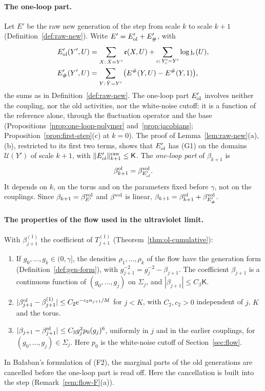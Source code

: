 \paragraph{The one-loop part.} Let $E'$ be the raw new generation of the step from scale $k$ to scale $k+1$ (Definition~\ref{def:raw-new}). Write $E'=E'_{\rm ol}+E'_\#$, with
\[
\begin{aligned}
E'_{\rm ol}(Y',U)&=\sum_{X:\,\bar X=Y'}\mathfrak e(X,U)+\sum_{c:\,Y'_c=Y'}\log\mathfrak j_c(U),\\
E'_\#(Y',U)&=\sum_{Y:\,\hat Y=Y'}\big(E^\#(Y,U)-E^\#(Y,1)\big),
\end{aligned}
\]
the sums as in Definition~\ref{def:raw-new}.
The one-loop part $E'_{\rm ol}$ involves neither the coupling, nor the old activities, nor the white-noise cutoff: it is a function of the reference alone, through the fluctuation operator and the base (Propositions~\ref{prop:one-loop-polymer} and~\ref{prop:jacobians}; Proposition~\ref{prop:first-step}(c) at $k=0$). The proof of Lemma~\ref{lem:raw-new}(a), (b), restricted to its first two terms, shows that $E'_{\rm ol}$ has (G1) on the domains $\mathcal U(Y')$ of scale $k+1$, with $\|E'_{\rm ol}\|^{\rm raw}_{k+1}\le\mathsf K$. The \emph{one-loop part} of $\beta_{k+1}$ is
\[
\beta^{\rm ol}_{k+1}=\beta^{\rm vol}_{E'_{\rm ol}}.
\]
It depends on $k$, on the torus and on the parameters fixed before $\gamma$, not on the couplings. Since $\beta_{k+1}=\beta^{\rm vol}_{E'}$ and $\beta^{\rm vol}$ is linear, $\beta_{k+1}=\beta^{\rm ol}_{k+1}+\beta^{\rm vol}_{E'_\#}$.

\paragraph{The properties of the flow used in the ultraviolet limit.} With $\beta^{(1)}_{j+1}$ the coefficient of $T^{(1)}_{j+1}$ (Theorem~\ref{thm:ol-cumulative}):
\begin{enumerate}[label=(F\arabic*)]
\item If $g_0,\dots,g_k\in(0,\gamma]$, the densities $\rho_1,\dots,\rho_k$ of the flow have the generation form (Definition~\ref{def:gen-form}), with $g_{j+1}^{-2}=g_j^{-2}-\beta_{j+1}$. The coefficient $\beta_{j+1}$ is a continuous function of $(g_0,\dots,g_j)$ on $\Sigma_j$, and $|\beta_{j+1}|\le C_\beta\mathsf K$.
\item $|\beta^{\rm ol}_{j+1}-\beta^{(1)}_{j+1}|\le C_2e^{-c_2n_{j+1}/M}$ for $j<K$, with $C_2,c_2>0$ independent of $j$, $K$ and the torus.
\item $|\beta_{j+1}-\beta^{\rm ol}_{j+1}|\le C_3g_j^2p_0(g_j)^6$, uniformly in $j$ and in the earlier couplings, for $(g_0,\dots,g_j)\in\Sigma_j$. Here $p_0$ is the white-noise cutoff of Section~\ref{sec:flow}.
\end{enumerate}
In Ba\l aban's formulation of (F2), the marginal parts of the old generations are cancelled before the one-loop part is read off. Here the cancellation is built into the step (Remark~\ref{rem:flow-F}(a)).

